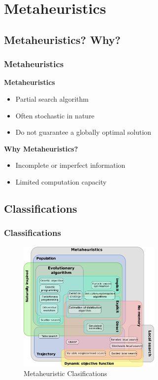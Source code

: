 \documentclass{beamer}
\begin{document}
\section{Metaheuristics}
\subsection{Metaheuristics? Why?}
\begin{frame}
\frametitle{Metaheuristics}
\textbf{Metaheuristics}
\begin{itemize}
\item Partial search algorithm
\item Often stochastic in nature
\item Do not guarantee a globally optimal solution
\end{itemize}

\textbf{Why Metaheuristics?}
\begin{itemize}
\item Incomplete or imperfect information
\item Limited computation capacity
\end{itemize}

\end{frame}

\subsection{Classifications}
\begin{frame}
\frametitle{Classifications}
\begin{figure}
\centering
\includegraphics[width=70mm ]{metaClasses.png}
\caption{Metaheuristic Clasifications}
\label{classes}
\end{figure}
\end{frame}
\end{document}
